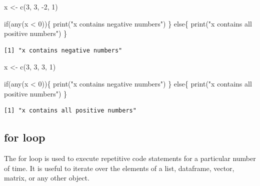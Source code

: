 \documentclass[
  letterpaper,
  DIV=11,
  numbers=noendperiod]{scrreprt}
\newenvironment{Shaded}{\begin{snugshade}}{\end{snugshade}}
\newcommand{\ControlFlowTok}[1]{\textcolor[rgb]{0.00,0.23,0.31}{#1}}
\newcommand{\DecValTok}[1]{\textcolor[rgb]{0.68,0.00,0.00}{#1}}
\newcommand{\FunctionTok}[1]{\textcolor[rgb]{0.28,0.35,0.67}{#1}}
\newcommand{\NormalTok}[1]{\textcolor[rgb]{0.00,0.23,0.31}{#1}}
\newcommand{\OtherTok}[1]{\textcolor[rgb]{0.00,0.23,0.31}{#1}}
\newcommand{\SpecialCharTok}[1]{\textcolor[rgb]{0.37,0.37,0.37}{#1}}
\newcommand{\StringTok}[1]{\textcolor[rgb]{0.13,0.47,0.30}{#1}}
\begin{document}
\begin{Shaded}
\begin{Highlighting}[]
\NormalTok{x }\OtherTok{\textless{}{-}} \FunctionTok{c}\NormalTok{(}\DecValTok{3}\NormalTok{, }\DecValTok{3}\NormalTok{, }\SpecialCharTok{{-}}\DecValTok{2}\NormalTok{, }\DecValTok{1}\NormalTok{)}

\ControlFlowTok{if}\NormalTok{(}\FunctionTok{any}\NormalTok{(x }\SpecialCharTok{\textless{}} \DecValTok{0}\NormalTok{))\{}
        \FunctionTok{print}\NormalTok{(}\StringTok{"x contains negative numbers"}\NormalTok{)}
\NormalTok{\} }\ControlFlowTok{else}\NormalTok{\{}
        \FunctionTok{print}\NormalTok{(}\StringTok{"x contains all positive numbers"}\NormalTok{)}
\NormalTok{\}}
\end{Highlighting}
\end{Shaded}

\begin{verbatim}
[1] "x contains negative numbers"
\end{verbatim}

\begin{Shaded}
\begin{Highlighting}[]
\NormalTok{x }\OtherTok{\textless{}{-}} \FunctionTok{c}\NormalTok{(}\DecValTok{3}\NormalTok{, }\DecValTok{3}\NormalTok{, }\DecValTok{3}\NormalTok{, }\DecValTok{1}\NormalTok{)}

\ControlFlowTok{if}\NormalTok{(}\FunctionTok{any}\NormalTok{(x }\SpecialCharTok{\textless{}} \DecValTok{0}\NormalTok{))\{}
        \FunctionTok{print}\NormalTok{(}\StringTok{"x contains negative numbers"}\NormalTok{)}
\NormalTok{\} }\ControlFlowTok{else}\NormalTok{\{}
        \FunctionTok{print}\NormalTok{(}\StringTok{"x contains all positive numbers"}\NormalTok{)}
\NormalTok{\}}
\end{Highlighting}
\end{Shaded}

\begin{verbatim}
[1] "x contains all positive numbers"
\end{verbatim}

\hypertarget{for-loop}{%
\subsection{for loop}\label{for-loop}}

The for loop is used to execute repetitive code statements for a
particular number of time. It is useful to iterate over the elements of
a list, dataframe, vector, matrix, or any other object.
\end{document}
